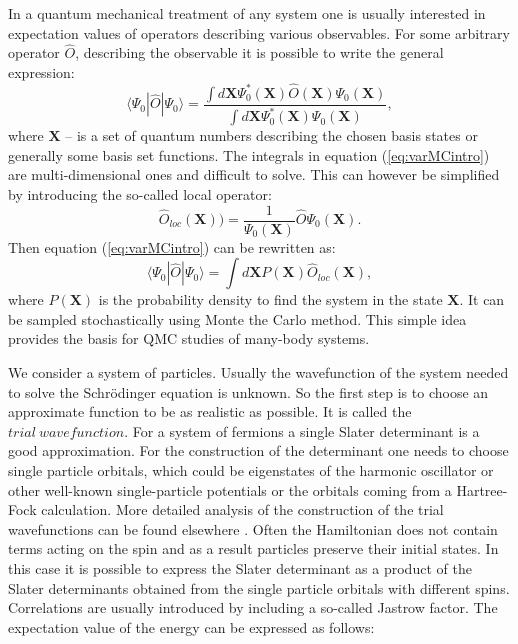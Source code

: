 \documentclass[twoside,english]{uiofysmaster}
\begin{document}
In a quantum mechanical treatment of any system one is usually
interested in expectation values of operators describing various
observables.  For some arbitrary operator $\hat{O}$, describing the
observable it is possible to write the  general expression:
\begin{equation}\label{eq:varMCintro}
\langle \Psi_0 |\hat{O}| \Psi_0 \rangle = \frac{\int d\boldsymbol{X}\Psi_0^{\ast}(\boldsymbol{X})\hat{O}(\boldsymbol{X})\Psi_0(\boldsymbol{X})}
{\int d\boldsymbol{X}\Psi_0^{\ast}(\boldsymbol{X})\Psi_0(\boldsymbol{X})},
\end{equation}
where $\boldsymbol{X}$ -- is a set of quantum numbers describing the chosen basis
states or generally some basis set functions. The integrals in
equation (\ref{eq:varMCintro}) are multi-dimensional ones and
difficult to solve. This can however be simplified by introducing the so-called 
local operator:
\begin{equation}\label{eq:varMCintro1}
\hat{O}_{loc}(\boldsymbol{X})) = \frac{1}{\Psi_0(\boldsymbol{X})} \hat{O} \Psi_0(\boldsymbol{X}).
\end{equation}
Then equation (\ref{eq:varMCintro}) can be rewritten as:
\begin{equation}\label{eq:varMCintro3}
\langle \Psi_0 |\hat{O}| \Psi_0 \rangle = \int d\boldsymbol{X} P(\boldsymbol{X})\hat{O}_{loc}(\boldsymbol{X}),
\end{equation}
where $P(\boldsymbol{X})$ is the probability density to find the system in the state $\boldsymbol{X}$. It can be sampled stochastically using Monte the Carlo method.
This simple idea provides the basis for QMC studies of many-body systems. 

We consider a system of particles. Usually the wavefunction of the
system needed to solve the Schr\"{o}dinger equation is unknown. So the
first step is to choose an approximate function to be as realistic as
possible. It is called the $trial\ wavefunction$. For a system of fermions
a single Slater determinant is a good approximation.  For the
construction of the determinant one needs to choose single particle
orbitals, which could be eigenstates of the harmonic oscillator or other well-known single-particle potentials or the
orbitals coming from a Hartree-Fock calculation. More detailed
analysis of the construction of the trial wavefunctions can be found
elsewhere \cite{Hjorth-Jensenadvancedcoursecomputational2017}
\cite{S.KvaalLectureNotesFysKjm44802015}.  Often the Hamiltonian does not
contain terms acting on the spin and as a result particles preserve
their initial states. In this case it is possible to express the
Slater determinant as a product of the Slater determinants obtained
from the single particle orbitals with different spins. Correlations
are usually introduced by including a so-called Jastrow factor.
The expectation value of the energy can be expressed as follows:
\end{document}
